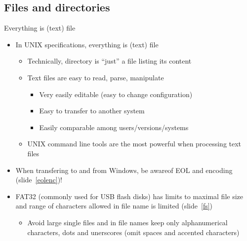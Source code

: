 \documentclass[compress, ucs, xelatex, 11pt, xcolor=svgnames,
  hyperref={
    bookmarks=true,
    unicode=true,
    colorlinks=true,
    pdftitle={Linux, command line and MetaCentrum},
    plainpages=false,
    pdfauthor={Vojtech Zeisek},
    pdfsubject={Course about use of Linux command line, writing shell scripts and using MetaCentrum of CESNET},
    pdfcreator={XeLaTeX},
    pdfkeywords={Linux, GNU, BASH, shell, command line, MetaCentrum},
    linkcolor=DarkRed,
    anchorcolor=DarkBlue,
    citecolor=Indigo,
    filecolor=NavyBlue,
    menucolor=DarkMagenta,
    urlcolor=DarkBlue,
    pdftex},
  url={hyphens, lowtilde} %
  ]{beamer}
\begin{document}
\subsection{Files and directories}

\begin{frame}{Everything is (text) file}
  \begin{itemize}
    \item In UNIX specifications, everything is (text) file
    \begin{itemize}
      \item Technically, directory is ``just'' a file listing its content
      \item Text files are easy to read, parse, manipulate
      \begin{itemize}
	\item Very easily editable (easy to change configuration)
	\item Easy to transfer to another system
	\item Easily comparable among users/versions/systems
      \end{itemize}
      \item UNIX command line tools are the most powerful when processing text files
    \end{itemize}
    \item When transfering to and from Windows, be awareof EOL and encoding (slide~\ref{eolenc})!
    \item FAT32 (commonly used for USB flash disks) has limits to maximal file size and range of characters allowed in file name is limited (slide~\ref{fs})
    \begin{itemize}
      \item Avoid large single files and in file names keep only alphanumerical characters, dots and unerscores (omit spaces and accented characters)
    \end{itemize}
    \end{itemize}
\end{frame}
\end{document}
